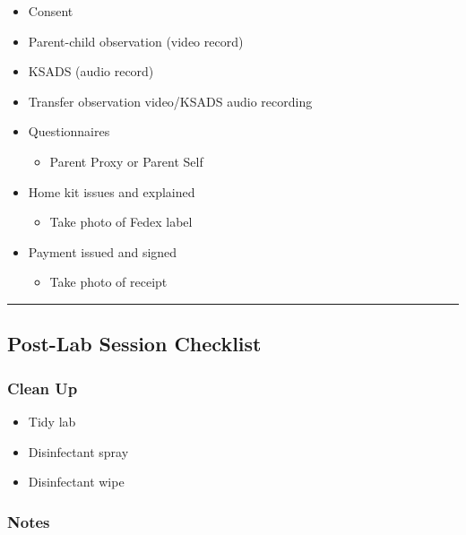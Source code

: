 \documentclass[]{book}
\providecommand{\tightlist}{%
  \setlength{\itemsep}{0pt}\setlength{\parskip}{0pt}}
\begin{document}
\begin{itemize}
\tightlist
\item
  Consent
\item
  Parent-child observation (video record)
\item
  KSADS (audio record)
\item
  Transfer observation video/KSADS audio recording
\item
  Questionnaires

  \begin{itemize}
  \tightlist
  \item
    Parent Proxy or Parent Self
  \end{itemize}
\item
  Home kit issues and explained

  \begin{itemize}
  \tightlist
  \item
    Take photo of Fedex label
  \end{itemize}
\item
  Payment issued and signed

  \begin{itemize}
  \tightlist
  \item
    Take photo of receipt
  \end{itemize}
\end{itemize}

\begin{center}\rule{0.5\linewidth}{0.5pt}\end{center}

\hypertarget{post-lab-session-checklist}{%
\subsection{Post-Lab Session Checklist}\label{post-lab-session-checklist}}

\hypertarget{clean-up}{%
\subsubsection{Clean Up}\label{clean-up}}

\begin{itemize}
\tightlist
\item
  Tidy lab
\item
  Disinfectant spray
\item
  Disinfectant wipe
\end{itemize}

\hypertarget{notes}{%
\subsubsection{Notes}\label{notes}}
\end{document}
